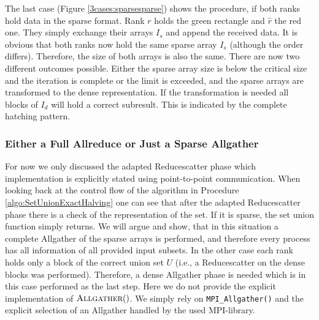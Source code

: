 The last case (Figure \ref{3cases:sparsesparse}) shows the procedure, if both ranks hold data in the sparse format. Rank $r$ holds the green rectangle and $\hat{r}$ the red one. They simply exchange their arrays $I_s$ and append the received data. It is obvious that both ranks now hold the same sparse array $I_s$ (although the order differs). Therefore, the size of both arrays is also the same. There are now two different outcomes possible. Either the sparse array size is below the critical size and the iteration is complete or the limit is exceeded, and the sparse arrays are transformed to the dense representation. If the transformation is needed all blocks of $I_d$ will hold a correct  subresult. This is indicated by the complete hatching pattern.

\subsubsection{Either a Full Allreduce or Just a Sparse Allgather}
For now we only discussed the adapted Reducescatter phase which implementation is explicitly stated using point-to-point communication. When looking back at the control flow of the algorithm in Procedure \ref{algo:SetUnionExactHalving} one can see that after the adapted Reducescatter phase there is a check of the representation of the set. If it is sparse, the set union function simply returns. We will argue and show, that in this situation a complete Allgather of the sparse arrays is performed, and therefore every process has all information of all provided input subsets. In the other case each rank holds only a block of the correct union set $U$ (i.e., a Reducescatter on the dense blocks was performed). Therefore, a dense Allgather phase is needed which is in this case performed as the last step. Here we do not provide the explicit implementation of $\Call{Allgather}{ }$. We simply rely on \texttt{MPI\_Allgather()} and the explicit selection of an Allgather handled by the used MPI-library.\\



